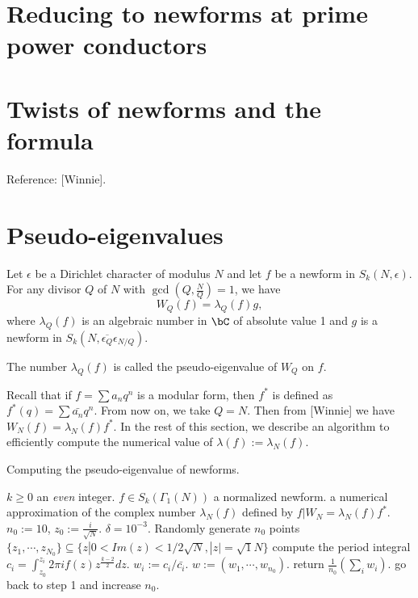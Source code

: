 \documentclass [11pt, proquest] {uwthesis}[2015/03/03]
\begin{document}
\section{Reducing to newforms at prime power conductors}

\section{Twists of newforms and the formula}

Reference: [Winnie]. 


\section{Pseudo-eigenvalues} 

Let $\epsilon$ be a Dirichlet character of modulus $N$ and let $f$ be a newform in $S_k(N,\epsilon)$. For any divisor $Q$ of $N$ with $\gcd(Q, \frac{N}{Q}) =1$, we have 
\[
	W_Q(f) = \lambda_Q(f) g, 
\]
where $\lambda_Q(f)$ is an algebraic number in $\bC$ of absolute value 1 and $g$ is a newform in $S_k(N, \overline{\epsilon_Q} \epsilon_{N/Q})$. 

\begin{Definition}
The number $\lambda_Q(f)$ is called the pseudo-eigenvalue of $W_Q$ on $f$. 
\end{Definition}

Recall that if $f = \sum a_nq^n$ is a modular form, then $f^*$ is defined as $f^*(q) = \sum \bar{a_n}q^n$. From now on, we take $Q = N$. Then from [Winnie] we have $W_N(f) = \lambda_N(f) f^*$. In the rest of this section, we describe an algorithm to efficiently compute the numerical value of $\lambda(f) := \lambda_N(f)$. 



\begin{algorithm}[H]
\caption{Computing the pseudo-eigenvalue of newforms.}
\label{alg: pseudo-eigenvalue}
\begin{algorithmic}[1]
    \REQUIRE $k \geq 0 $ an {\it even} integer. $f \in S_k(\Gamma_1(N))$ a normalized newform.    
    \ENSURE a numerical approximation of the complex number $\lambda_N(f)$ defined by $f|W_N = \lambda_N(f) f^*$.   
    \STATE $n_0 := 10$, $z_0 := \frac{i}{\sqrt{N}}$. $\delta = 10^{-3}$. 
    \STATE Randomly generate $n_0$ points $\{z_1, \cdots, z_{N_0}\} \subseteq \{z | 0 < Im(z) < 1/2\sqrt{N}, |z| = \sqrt{1}{N} \}$
    	\STATE compute the period integral $c_i =  \int_{z_0}^{z_i} 2\pi i f(z) z^{\frac{k-2}{2}} dz$. 
	\STATE $w_i := c_i/\bar{c_i}$. 
    \ENDFOR
    \STATE $w := (w_1, \cdots, w_{n_0})$. 
     \STATE return $\frac{1}{n_0}(\sum_i w_i)$. 
    \ELSE
    	\STATE go back to step 1 and increase $n_0$. 
    \ENDIF
\end{algorithmic}
\end{algorithm}
\end{document}
